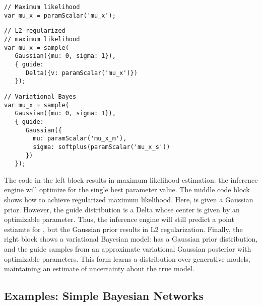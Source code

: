 \begin{minipage}{0.33\linewidth}
\begin{lstlisting}[style=learnableModels]
// Maximum likelihood
var mu_x = paramScalar('mu_x');
\end{lstlisting}
\end{minipage}
%
\hspace{-2em}
%
\begin{minipage}{0.33\linewidth}
\begin{lstlisting}[style=learnableModels]
// L2-regularized
// maximum likelihood
var mu_x = sample(
   Gaussian({mu: 0, sigma: 1}),
   { guide:
      Delta({v: paramScalar('mu_x')})
   });
\end{lstlisting}
\end{minipage}
%
\hspace{-1em}
%
\begin{minipage}{0.33\linewidth}
\begin{lstlisting}[style=learnableModels]
// Variational Bayes
var mu_x = sample(
   Gaussian({mu: 0, sigma: 1}),
   { guide:
      Gaussian({
        mu: paramScalar('mu_x_m'),
        sigma: softplus(paramScalar('mu_x_s'))
      })
   });
\end{lstlisting}
\end{minipage}

The code in the left block results in maximum likelihood estimation: the inference engine will optimize for the single best parameter value.
The middle code block shows how to achieve regularized maximum likelihood. Here,  is given a Gaussian prior. However, the guide distribution is a Delta whose center is given by an optimizable parameter. Thus, the inference engine will still predict a point estiamte for , but the Gaussian prior results in L2 regularization.
Finally, the right block shows a variational Bayesian model:  has a Gaussian prior distribution, and the guide samples  from an approximate variational Gaussian posterior with optimizable parameters.
This form learns a distribution over generative models, maintaining an estimate of uncertainty about the true model.



\subsection{Examples: Simple Bayesian Networks}


